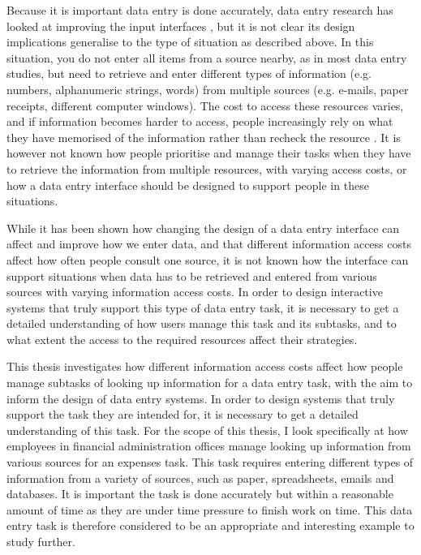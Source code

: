 Because it is important data entry is done accurately, data entry research has looked at improving the input interfaces \citep[e.g.][]{Oladimeji2013, Vertanen2015, Wiseman2013a}, but it is not clear its design implications generalise to the type of situation as described above. In this situation, you do not enter all items from a source nearby, as in most data entry studies, but need to retrieve and enter different types of information (e.g. numbers, alphanumeric strings, words) from multiple sources (e.g. e-mails, paper receipts, different computer windows). The cost to access these resources varies, and if information becomes harder to access, people increasingly rely on what they have memorised of the information rather than recheck the resource \citep{Gray2006}. It is however not known how people prioritise and manage their tasks when they have to retrieve the information from multiple resources, with varying access costs, or how a data entry interface should be designed to support people in these situations. 

While it has been shown how changing the design of a data entry interface can affect and improve how we enter data, and that different information access costs affect how often people consult one source, it is not known how the interface can support situations when data has to be retrieved and entered from various sources with varying information access costs. In order to design interactive systems that truly support this type of data entry task, it is necessary to get a detailed understanding of how users manage this task and its subtasks, and to what extent the access to the required resources affect their strategies.

This thesis investigates how different information access costs affect how people manage subtasks of looking up information for a data entry task, with the aim to inform the design of data entry systems. 
In order to design systems that truly support the task they are intended for, it is necessary to get a detailed understanding of this task. 
For the scope of this thesis, I look specifically at how employees in financial administration offices manage looking up information from various sources for an expenses task. This task requires entering different types of information from a variety of sources, such as paper, spreadsheets, emails and databases. It is important the task is done accurately but within a reasonable amount of time as they are under time pressure to finish work on time. This data entry task is therefore considered to be an appropriate and interesting example to study further. 

